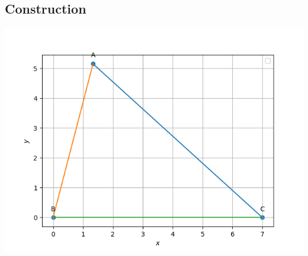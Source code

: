 \documentclass[10pt,a4paper]{report}
\begin{document}
\begin{multicols}{2}
 \section{Construction}
 	\begin{center}
  \includegraphics[scale=0.5]{Figure_1.png}
  	\end{center}
  


  



\vspace{3cm}


\end{multicols}
\end{document}

